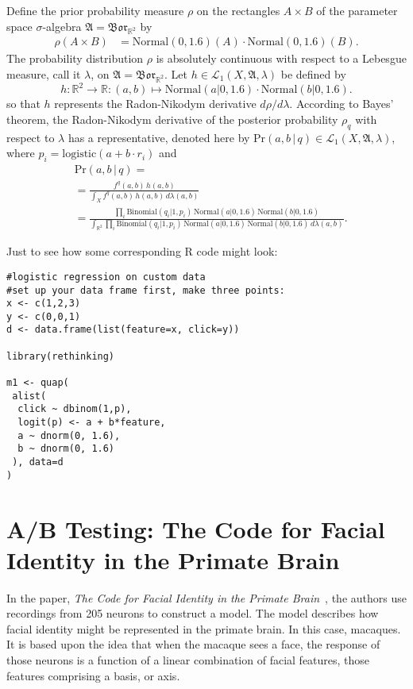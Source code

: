 \documentclass[
twoside=true,
paper=letter,
fontsize=11pt,
pagesize=auto,
leqno,
openany,
headsepline,
overfullrule,
]{scrbook}
\theoremstyle{plain}
\theoremstyle{plain}
\theoremstyle{definition}
\theoremstyle{bfnoteitalic}
\theoremstyle{bfnoteroman}
\newcommand{\sigalg}[1]{\mathfrak{#1}}
\newcommand{\cali}[1]{\mathscr{#1}}
\newcommand{\borel}{\mathfrak{Bor}}
\newcommand{\textsigma}{\hbox{\large{$\sigma$}}\kern-1pt}
\newcommand{\R}{\mathbb{R}}
\newcommand{\function}{f}
\newcommand{\functioniii}{h}
\newcommand{\measurespace}{X}
\newcommand{\seti}{A}
\newcommand{\setii}{B}
\newcommand{\pspace}{\measurespace}%
\newcommand{\pspacesig}{\sigalg{A}}
\begin{document}
Define the prior probability measure $\rho$ on the rectangles
$\seti\times\setii$ of the parameter space \textsigma-algebra
$\pspacesig=\borel_{\R^2}$ by
\begin{align*}
\rho(\seti\times\setii)
&=
\text{Normal}(0,1.6)(\seti)\cdot
\text{Normal}(0,1.6)(\setii).
\end{align*}
The probability distribution $\rho$ is absolutely continuous with respect to a Lebesgue measure, call it
$\lambda$, on $\pspacesig=\borel_{\R^2}$.
Let $\functioniii\in\cali{L}_1(\pspace,\pspacesig,\lambda)$ be defined by
\[
\functioniii:\R^2\to\R:(a,b)\mapsto
\text{Normal}(a\vert 0,1.6)\cdot
\text{Normal}(b\vert 0,1.6).
\]
so that $\functioniii$ represents the Radon-Nikodym derivative $d\rho/d\lambda$.
According to Bayes' theorem, the Radon-Nikodym derivative of the posterior probability
$\rho_{q}$ with respect to $\lambda$ has a representative, denoted here by
$\text{Pr}(a,b\,\vert\, q)\in\cali{L}_1(\pspace, \pspacesig,\lambda)$,
where $p_i=\text{logistic}(a + b\cdot r_i)$ and
\begin{align*}
&\text{Pr}(a,b\,\vert\, q) =
\\
& =
\frac{\function^{q}(a,b)\,\functioniii(a,b)}
{\int_{\pspace}\function^{q}(a,b)\,\functioniii(a,b)\,d\lambda(a,b)} \\
& =
\frac{
\prod_i
\text{Binomial}(q_i \vert 1, p_i)\,
\text{Normal}(a\vert 0,1.6)\,
\text{Normal}(b\vert 0,1.6)}
{\int_{\R^2}
\prod_i \text{Binomial}(q_i \vert 1, p_i)\,
\text{Normal}(a\vert 0,1.6)\,
\text{Normal}(b\vert 0,1.6)
\,d\lambda(a,b)}.
\end{align*}

Just to see how some corresponding R code might look:
\begin{rcode}[threepoint]
\begin{lstlisting}
#logistic regression on custom data
#set up your data frame first, make three points:
x <- c(1,2,3)
y <- c(0,0,1)
d <- data.frame(list(feature=x, click=y))

library(rethinking)

m1 <- quap(
 alist(
  click ~ dbinom(1,p),
  logit(p) <- a + b*feature,
  a ~ dnorm(0, 1.6),
  b ~ dnorm(0, 1.6)
 ), data=d
)
\end{lstlisting}
\end{rcode}


\section{A/B Testing: The Code for Facial Identity in the Primate Brain}
In the paper, \textsl{The Code for Facial Identity in the Primate Brain}~\cite{tcffiitpb_chang_2017}, the authors use recordings from 205 neurons to construct a model. The model describes how facial identity might be represented in the primate brain. In this case, macaques. It is based upon the idea that when the macaque sees a face, the response of those neurons is a function of a linear combination of facial features, those features comprising a basis, or axis.
\end{document}
